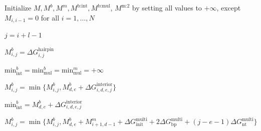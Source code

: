 \documentclass[11pt,letterpaper]{article}  \usepackage[margin=1in]{geometry}
\theoremstyle{definition}  \newtheorem{Definition}[theorem]{Definition}
\newcommand{\snMFE}{snMFE\xspace}
\newcommand{\SymnMFE}{Symmetry-naive MFE\xspace}
\begin{document}
\begin{algorithm}[H] 
\caption{\small\SymnMFE (\snMFE) algorithm pseudocode  that takes as input: $c=\mathcal{O}(1)$ strands with total number of bases (length) $N$ and strand ordering $\pi$. 
		Runs in  $\mathcal{O}(N^4)$ time and $\mathcal{O}(N^3)$ space with
		recursive calls illustrated in \cref{fig:mfe}. Nicks between strands are denoted by half indices (e.g.~$x+ \frac{1}{2}$). 
		The function $\eta[i+ \frac{1}{2}, j+\frac{1}{2}]$ returns the number of nicks in the interval $[i+ \frac{1}{2}, j+\frac{1}{2}]$. 
		The shorthand $\eta[i+ \frac{1}{2}]$ is equivalent to $\eta[i+ \frac{1}{2}, i+\frac{1}{2}]$ and by convention, $\eta[i+ \frac{1}{2}, i-\frac{1}{2}] =0$.
	} \label{algo:1}
	\begin{algorithmic}[1]
		\footnotesize
		\State Initialize $M, M^b, M^m, M^\text{b:int}, M^\text{b:mul}$,  $M^\text{m:2}$  by setting all values to $+\infty$, except $M_{i,i-1} = 0$ for all $i=1,\ldots,N$
		
		\State $j = i+l-1$
		
		$M_{i,j}^b =\Delta G_{i,j}^\text{hairpin}$
		
		
		
		\EndIf 
		
		\State $\text{min}_\text{int}^b =  \text{min}_\text{mul}^b = \text{min}_\text{mul}^m = +\infty$
		
		
		
		
		
		$M_{i,j}^b = \min \{ M_{i,j}^b, M_{d,e}^b + \Delta G_{i,d,e,j}^\text{interior} \}$
		
		$\text{min}_\text{int}^b = M_{d,e}^b + \Delta G_{i,d,e,j}^\text{interior} $
		
		\EndIf
		
		
		\EndIf 
		
		
		\State  $M_{i,j}^b = \min \{ M_{i,j}^b, M^b_{d,e} + M^m_{i+1,d-1} + \Delta G_\text{init}^\text{multi} + 2\Delta G_\text{bp}^\text{multi} + (j-e-1)\Delta G_\text{nt}^\text{multi}\}$
		

\end{algorithmic}
\end{algorithm}
\end{document}
